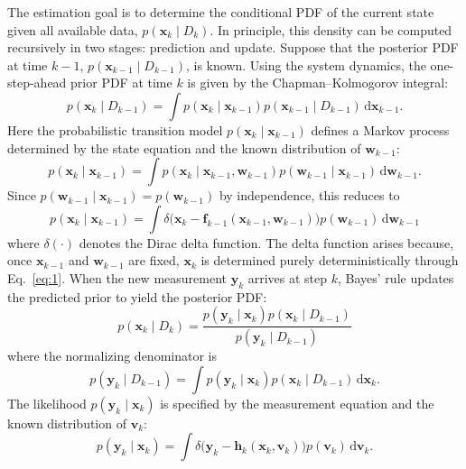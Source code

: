 The estimation goal is to determine the conditional PDF of the current state given all available data, $p(\bm{x}_k \mid D_k)$. In principle, this density can be computed recursively in two stages: prediction and update. Suppose that the posterior PDF at time $k - 1$, $p(\bm{x}_{k-1} \mid D_{k-1})$, is known. Using the system dynamics, the one-step-ahead prior PDF at time $k$ is given by the Chapman–Kolmogorov integral:
\begin{equation}\label{eq:3}
p(\bm{x}_k \mid D_{k-1}) = \int p(\bm{x}_k \mid \bm{x}_{k-1}) p(\bm{x}_{k-1} \mid D_{k-1}) \, \mathrm{d}\bm{x}_{k-1}.
\end{equation}
Here the probabilistic transition model $p(\bm{x}_k \mid \bm{x}_{k-1})$ defines a Markov process determined by the state equation and the known distribution of $\bm{w}_{k-1}$:
\begin{equation*}
p(\bm{x}_k \mid \bm{x}_{k-1}) = \int p(\bm{x}_k \mid \bm{x}_{k-1}, \bm{w}_{k-1}) p(\bm{w}_{k-1} \mid \bm{x}_{k-1}) \, \mathrm{d}\bm{w}_{k-1}.
\end{equation*}
Since $p(\bm{w}_{k-1} \mid \bm{x}_{k-1}) = p(\bm{w}_{k-1})$ by independence, this reduces to
\begin{equation}\label{eq:4}
p(\bm{x}_k \mid \bm{x}_{k-1}) = \int \delta\bigl(\bm{x}_k - \bm{f}_{k-1}(\bm{x}_{k-1}, \bm{w}_{k-1})\bigr) p(\bm{w}_{k-1}) \, \mathrm{d}\bm{w}_{k-1}
\end{equation}
where $\delta(\cdot)$ denotes the Dirac delta function. The delta function arises because, once $\bm{x}_{k-1}$ and $\bm{w}_{k-1}$ are fixed, $\bm{x}_k$ is determined purely deterministically through Eq.~\eqref{eq:1}. When the new measurement $\bm{y}_k$ arrives at step $k$, Bayes' rule updates the predicted prior to yield the posterior PDF:
\begin{equation}\label{eq:5}
p(\bm{x}_k \mid D_k) = \frac{p(\bm{y}_k \mid \bm{x}_k) p(\bm{x}_k \mid D_{k-1})}{p(\bm{y}_k \mid D_{k-1})}
\end{equation}
where the normalizing denominator is
\begin{equation}\label{eq:6}
p(\bm{y}_k \mid D_{k-1}) = \int p(\bm{y}_k \mid \bm{x}_k) p(\bm{x}_k \mid D_{k-1}) \, \mathrm{d}\bm{x}_k.
\end{equation}
The likelihood $p(\bm{y}_k \mid \bm{x}_k)$ is specified by the measurement equation and the known distribution of $\bm{v}_k$:
\begin{equation}\label{eq:7}
p(\bm{y}_k \mid \bm{x}_k) = \int \delta\bigl(\bm{y}_k - \bm{h}_k(\bm{x}_k, \bm{v}_k)\bigr) p(\bm{v}_k) \, \mathrm{d}\bm{v}_k.
\end{equation}


